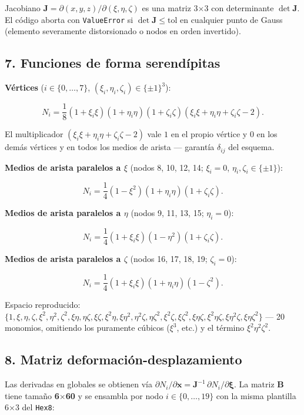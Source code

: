 \documentclass[11pt,letterpaper,oneside]{report}
\begin{document}
Jacobiano $\mathbf J = \partial(x, y, z) / \partial(\xi, \eta, \zeta)$ es una matriz 3\ensuremath{\times}3 con determinante $\det\mathbf J$. El código aborta con \texttt{ValueError} si $\det\mathbf J \le \text{tol}$ en cualquier punto de Gauss (elemento severamente distorsionado o nodos en orden invertido).

\subsection{7. Funciones de forma serendípitas}

\textbf{Vértices} ($i \in \{0,\dots,7\}$, $(\xi_i, \eta_i, \zeta_i) \in \{\pm 1\}^3$):

\[
N_i = \frac{1}{8}(1 + \xi_i\xi)(1 + \eta_i\eta)(1 + \zeta_i\zeta)(\xi_i\xi + \eta_i\eta + \zeta_i\zeta - 2).
\]

El multiplicador $(\xi_i\xi + \eta_i\eta + \zeta_i\zeta - 2)$ vale $1$ en el propio vértice y $0$ en los demás vértices y en todos los medios de arista --- garantía $\delta_{ij}$ del esquema.

\textbf{Medios de arista paralelos a $\xi$} (nodos 8, 10, 12, 14; $\xi_i = 0$, $\eta_i, \zeta_i \in \{\pm 1\}$):

\[
N_i = \frac{1}{4}(1 - \xi^2)(1 + \eta_i\eta)(1 + \zeta_i\zeta).
\]

\textbf{Medios de arista paralelos a $\eta$} (nodos 9, 11, 13, 15; $\eta_i = 0$):

\[
N_i = \frac{1}{4}(1 + \xi_i\xi)(1 - \eta^2)(1 + \zeta_i\zeta).
\]

\textbf{Medios de arista paralelos a $\zeta$} (nodos 16, 17, 18, 19; $\zeta_i = 0$):

\[
N_i = \frac{1}{4}(1 + \xi_i\xi)(1 + \eta_i\eta)(1 - \zeta^2).
\]

Espacio reproducido: $\{1, \xi, \eta, \zeta, \xi^2, \eta^2, \zeta^2, \xi\eta, \eta\zeta, \xi\zeta, \xi^2\eta, \xi\eta^2, \eta^2\zeta, \eta\zeta^2, \xi^2\zeta, \xi\zeta^2, \xi\eta\zeta, \xi^2\eta\zeta, \xi\eta^2\zeta, \xi\eta\zeta^2\}$ --- 20 monomios, omitiendo los puramente cúbicos ($\xi^3$, etc.) y el término $\xi^2\eta^2\zeta^2$.

\subsection{8. Matriz deformación-desplazamiento}

Las derivadas en globales se obtienen vía $\partial N_i / \partial \mathbf x = \mathbf J^{-1}\,\partial N_i / \partial \boldsymbol\xi$. La matriz $\mathbf B$ tiene tamaño \textbf{6\ensuremath{\times}60} y se ensambla por nodo $i \in \{0,\dots,19\}$ con la misma plantilla 6\ensuremath{\times}3 del \texttt{Hex8}:
\end{document}
